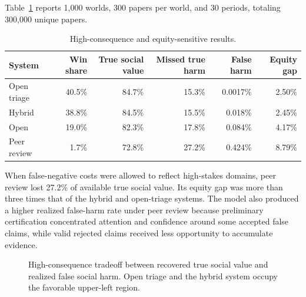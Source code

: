 \documentclass[11pt]{article}
\begin{document}
Table~\ref{tab:harm} reports 1,000 worlds, 300 papers per world, and 30 periods, totaling 300,000 unique papers.

\begin{table}[ht]
\centering
\caption{High-consequence and equity-sensitive results.}
\label{tab:harm}
\small
\begin{tabular}{lrrrrr}
\toprule
System & Win share & True social value & Missed true harm & False harm & Equity gap\\
\midrule
Open triage & 40.5\% & 84.7\% & 15.3\% & 0.0017\% & 2.50\%\\
Hybrid & 38.8\% & 84.5\% & 15.5\% & 0.018\% & 2.45\%\\
Open & 19.0\% & 82.3\% & 17.8\% & 0.084\% & 4.17\%\\
Peer review & 1.7\% & 72.8\% & 27.2\% & 0.424\% & 8.79\%\\
\bottomrule
\end{tabular}
\end{table}

When false-negative costs were allowed to reflect high-stakes domains, peer review lost 27.2\% of available true social value. Its equity gap was more than three times that of the hybrid and open-triage systems. The model also produced a higher realized false-harm rate under peer review because preliminary certification concentrated attention and confidence around some accepted false claims, while valid rejected claims received less opportunity to accumulate evidence.


\begin{figure}[ht]
\centering
{}
\caption{High-consequence tradeoff between recovered true social value and realized false social harm. Open triage and the hybrid system occupy the favorable upper-left region.}
\label{fig:highconsequence_tradeoff}
\end{figure}
\end{document}
